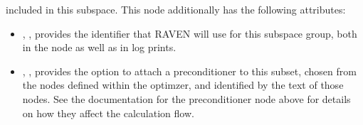 {\begin{itemize}
      included in this subspace.  This node additionally has the following attributes:
      \begin{itemize}
        \item {}, , provides the identifier that RAVEN
          will use for this subspace group, both in the  node as well as in log
          prints.
        \item {}, , provides the option to attach
          a preconditioner to this subset, chosen from the  nodes defined within
          the optimzer, and identified by the text of those nodes.  See the documentation for the
          preconditioner node above for details on how they affect the calculation flow.
      \end{itemize}
  \end{itemize}}

